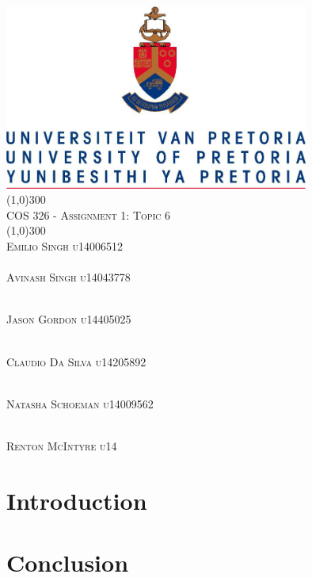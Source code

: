 \documentclass{article}
\begin{document}
\begin{titlepage}
	\begin{center}
		\includegraphics[width=10cm]{img/UP.jpg}  \\
		[1cm]
		\line(1,0){300} \\
		[0.3cm]
		\textsc{\Large
			COS 326 - Assignment 1: Topic 6	\\ [0.3cm]
		}
		\line(1,0){300} \\
		[2.9cm]
		\textsc{\LARGE
			Emilio Singh 
			u14006512\\
		}
		\textsc{\LARGE
			\\Avinash Singh
			u14043778 \\
		} 
		
		\textsc{\LARGE
			\\Jason Gordon 
			u14405025 \\
		}
		
		\textsc{\LARGE
			\\Claudio Da Silva 
			u14205892 \\
		}
	
		\textsc{\LARGE
			\\Natasha Schoeman
			u14009562 \\
		}
		
		\textsc{\LARGE
			\\Renton McIntyre 
			u14 \\
		}

		
	\end{center}
	\begin{center}
		
		
	\end{center}
\end{titlepage}


\tableofcontents
\thispagestyle{empty}
\cleardoublepage



\setcounter{page}{1}
\section{Introduction}
	
\section{Conclusion}



\end{document}
